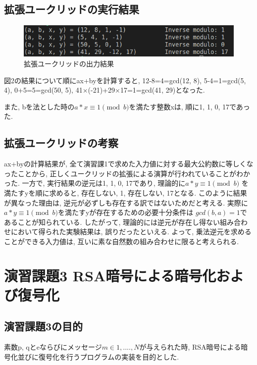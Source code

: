 \documentclass[xelatex, 11pt, a4paper, ja=standard]{bxjsarticle}
\begin{document}
\subsection{拡張ユークリッドの実行結果}

\begin{figure}[htbp]
    \centering
    \includegraphics[height=0.15\textwidth,keepaspectratio]{./image/extendedEuclid.png}
    \caption{拡張ユークリッドの出力結果}
    \label{fig:screenshot}
\end{figure}

図2の結果について順にax+byを計算すると, 
12-8=4=gcd(12, 8), 5-4=1=gcd(5, 4), 
0+5=5=gcd(50, 5), 41×(-21)+29×17=1=gcd(41, 29)となった. 

また, bを法とした時の$a*x \equiv {1} \pmod{b}$を満たす整数xは, 
順に1, 1, 0, 17であった. 

\subsection{拡張ユークリッドの考察}
ax+byの計算結果が, 全て演習課1で求めた入力値に対する最大公約数に等しくなったことから, 
正しくユークリッドの拡張による演算が行われていることがわかった. 
一方で, 実行結果の逆元は1, 1, 0, 17であり, 理論的に$a*y \equiv {1} \pmod{b}$
を満たすyを順に求めると, 存在しない, 1, 存在しない, 17となる. 
このように結果が異なった理由は, 逆元が必ずしも存在する訳ではないためだと考える. 
実際に$a*y \equiv {1} \pmod{b}$を満たすyが存在するための必要十分条件は
$gcd(b, a)=1$であることが知られている. 
したがって, 理論的には逆元が存在し得ない組み合わせにおいて得られた実験結果は, 誤りだったといえる. 
よって, 乗法逆元を求めることができる入力値は, 互いに素な自然数の組み合わせに限ると考えられる. 

\section{演習課題3 RSA暗号による暗号化および復号化}
\subsection{演習課題3の目的}
素数p, qとeならびにメッセージ$m\in{1,....,N}$が与えられた時, RSA暗号による暗号化並びに復号化を行うプログラムの実装を目的とした. 
\end{document}
